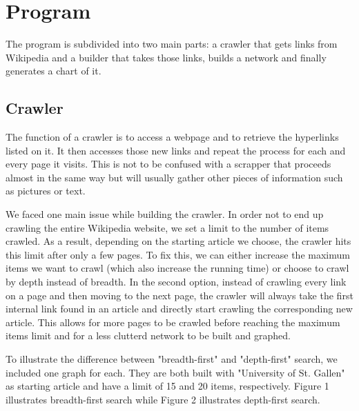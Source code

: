 \documentclass[10pt]{article}
\begin{document}
\section{Program}
The program is subdivided into two main parts: a crawler that gets links from Wikipedia and a builder that takes those links, builds a network and finally generates a chart of it.

	\subsection{Crawler}
	The function of a crawler is to access a webpage and to retrieve the hyperlinks listed on it. It then accesses those new links and repeat the process for each and every page it 	
	visits. This is not to be confused with a scrapper that proceeds almost in the same way but will usually gather other pieces of information such as pictures or text.
	\par \noindent
	We faced one main issue while building the crawler. In order not to end up crawling the entire Wikipedia website, we set a limit to the number of items crawled. As a result, 	
	depending on the starting article we choose, the crawler hits this limit after only a few pages. To fix this, we can either increase the maximum items we want to crawl (which also 
	increase the running time) or choose to crawl by depth instead of breadth. In the second option, instead of crawling every link on a page and then moving to the next page, the 
	crawler will always take the first internal link found in an article and directly start crawling the corresponding new article. This allows for more pages to be crawled before reaching 
	the maximum items limit and for a less clutterd network to be built and graphed.\par \noindent

	To illustrate the difference between "breadth-first" and "depth-first" search, we included one graph for each. They are both built with "University of St. Gallen" as starting article and 	have a limit of 15 and 20 items, respectively. Figure 1 illustrates breadth-first search while Figure 2 illustrates depth-first search.\\
	
\end{document}
